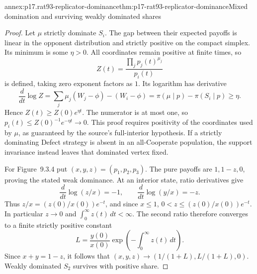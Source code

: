 \begin{annexitem}{annex:p17.rat93-replicator-dominance}{thm:p17-rat93-replicator-dominance}{Mixed domination and surviving weakly dominated shares}
\begin{proof}
Let \(\mu\) strictly dominate \(S_i\). The gap between their
expected payoffs is linear in the opponent distribution and strictly
positive on the compact simplex. Its minimum is some \(\eta>0\).
All coordinates remain positive at finite times, so
\[
 Z(t)=\frac{\prod_jp_j(t)^{\mu_j}}{p_i(t)}
\]
is defined, taking zero exponent factors as \(1\). Its logarithm has
derivative
\[
 \frac{d}{dt}\log Z
     =\sum_j\mu_j(W_j-\phi)-(W_i-\phi)
     =\pi(\mu\mid p)-\pi(S_i\mid p)\geq\eta.
\]
Hence \(Z(t)\geq Z(0)e^{\eta t}\). The numerator is at most
one, so \(p_i(t)\leq Z(0)^{-1}e^{-\eta t}\to0\).
This proof requires positivity of the coordinates used by \(\mu\),
as guaranteed by the source's full-interior hypothesis. If a strictly
dominating Defect strategy is absent in an all-Cooperate population,
the support invariance instead leaves that dominated vertex fixed.

For Figure~9.3.4 put \((x,y,z)=(p_1,p_2,p_3)\).
The pure payoffs are \(1,1-z,0\), proving the stated weak
dominance. At an interior state, ratio derivatives give
\[
 \frac{d}{dt}\log(z/x)=-1,\qquad
 \frac{d}{dt}\log(y/x)=-z.
\]
Thus \(z/x=(z(0)/x(0))e^{-t}\), and since \(x\leq1\),
\(0<z\leq(z(0)/x(0))e^{-t}\). In particular \(z\to0\) and
\(\int_0^\infty z(t)\,dt<\infty\). The second ratio therefore
converges to a finite strictly positive constant
\[
 L=\frac{y(0)}{x(0)}\exp\!\left(-\int_0^\infty z(t)\,dt\right).
\]
Since \(x+y=1-z\), it follows that
\((x,y,z)\to(1/(1+L),L/(1+L),0)\). Weakly dominated
\(S_2\) survives with positive share.
\end{proof}
\end{annexitem}

